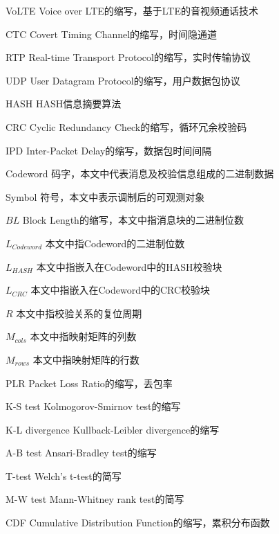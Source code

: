 \begin{denotation}
	
\item[VoLTE] Voice over LTE的缩写，基于LTE的音视频通话技术
\item[CTC] Covert Timing Channel的缩写，时间隐通道
\item[RTP] Real-time Transport Protocol的缩写，实时传输协议
\item[UDP] User Datagram Protocol的缩写，用户数据包协议
\item[HASH] HASH信息摘要算法
\item[CRC] Cyclic Redundancy Check的缩写，循环冗余校验码
\item[IPD] Inter-Packet Delay的缩写，数据包时间间隔
\item[] 
\item[Codeword] 码字，本文中代表消息及校验信息组成的二进制数据
\item[Symbol] 符号，本文中表示调制后的可观测对象
\item[$BL$] Block Length的缩写，本文中指消息块的二进制位数
\item[$L_{Codeword}$] 本文中指Codeword的二进制位数
\item[$L_{HASH}$] 本文中指嵌入在Codeword中的HASH校验块
\item[$L_{CRC}$] 本文中指嵌入在Codeword中的CRC校验块
\item[$R$] 本文中指校验关系的复位周期
\item[$M_{cols}$] 本文中指映射矩阵的列数
\item[$M_{rows}$] 本文中指映射矩阵的行数
\item[] 
\item[PLR] Packet Loss Ratio的缩写，丢包率
\item[K-S test] Kolmogorov-Smirnov test的缩写
\item[K-L divergence] Kullback-Leibler divergence的缩写
\item[A-B test] Ansari-Bradley test的缩写
\item[T-test] Welch’s t-test的简写
\item[M-W test] Mann-Whitney rank test的简写
\item[CDF] Cumulative Distribution Function的缩写，累积分布函数

\end{denotation}
